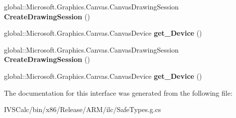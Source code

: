 \begin{DoxyCompactItemize}
\mbox{\label{interface_microsoft_1_1_graphics_1_1_canvas_1_1_i_canvas_command_list_a4014c009705d90f8436b5970fe9514c3}} 
global\+::\+Microsoft.\+Graphics.\+Canvas.\+Canvas\+Drawing\+Session {\bfseries Create\+Drawing\+Session} ()
\item 
\mbox{\label{interface_microsoft_1_1_graphics_1_1_canvas_1_1_i_canvas_command_list_a8cc2c42c3b23be04878b00b778a7f60d}} 
global\+::\+Microsoft.\+Graphics.\+Canvas.\+Canvas\+Device {\bfseries get\+\_\+\+Device} ()
\item 
\mbox{\label{interface_microsoft_1_1_graphics_1_1_canvas_1_1_i_canvas_command_list_a4014c009705d90f8436b5970fe9514c3}} 
global\+::\+Microsoft.\+Graphics.\+Canvas.\+Canvas\+Drawing\+Session {\bfseries Create\+Drawing\+Session} ()
\item 
\mbox{\label{interface_microsoft_1_1_graphics_1_1_canvas_1_1_i_canvas_command_list_a8cc2c42c3b23be04878b00b778a7f60d}} 
global\+::\+Microsoft.\+Graphics.\+Canvas.\+Canvas\+Device {\bfseries get\+\_\+\+Device} ()
\end{DoxyCompactItemize}


The documentation for this interface was generated from the following file\+:\begin{DoxyCompactItemize}
\item 
I\+V\+S\+Calc/bin/x86/\+Release/\+A\+R\+M/ilc/Safe\+Types.\+g.\+cs\end{DoxyCompactItemize}
